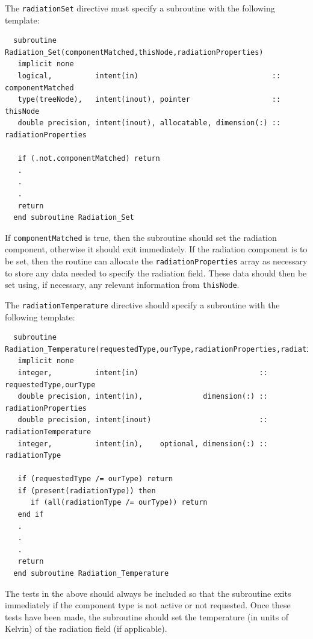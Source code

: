 The {\tt radiationSet} directive must specify a subroutine with the following template:
\begin{verbatim}
  subroutine Radiation_Set(componentMatched,thisNode,radiationProperties)
   implicit none
   logical,          intent(in)                               :: componentMatched
   type(treeNode),   intent(inout), pointer                   :: thisNode
   double precision, intent(inout), allocatable, dimension(:) :: radiationProperties

   if (.not.componentMatched) return
   .
   .
   .
   return
  end subroutine Radiation_Set
\end{verbatim}
If {\tt componentMatched} is true, then the subroutine should set the radiation component, otherwise it should exit immediately. If the radiation component is to be set, then the routine can allocate the {\tt radiationProperties} array as necessary to store any data needed to specify the radiation field. These data should then be set using, if necessary, any relevant information from {\tt thisNode}.

The {\tt radiationTemperature} directive should specify a subroutine with the following template:
\begin{verbatim}
  subroutine Radiation_Temperature(requestedType,ourType,radiationProperties,radiationTemperature,radiationType)
   implicit none
   integer,          intent(in)                            :: requestedType,ourType
   double precision, intent(in),              dimension(:) :: radiationProperties
   double precision, intent(inout)                         :: radiationTemperature
   integer,          intent(in),    optional, dimension(:) :: radiationType

   if (requestedType /= ourType) return
   if (present(radiationType)) then
      if (all(radiationType /= ourType)) return
   end if
   .
   .
   .
   return
  end subroutine Radiation_Temperature
\end{verbatim}
The tests in the above should always be included so that the subroutine exits immediately if the component type is not active or not requested. Once these tests have been made, the subroutine should set the temperature (in units of Kelvin) of the radiation field (if applicable).

